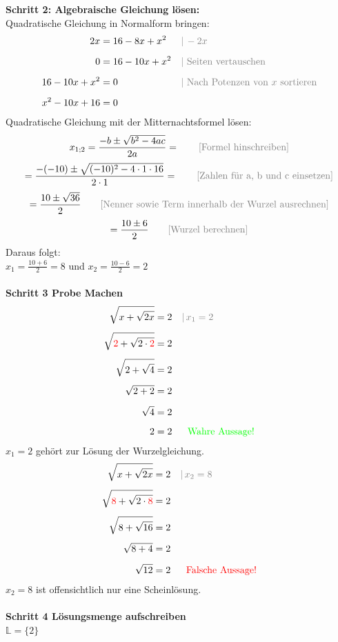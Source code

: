 \documentclass[a4paper,10pt]{article}
\begin{document}
\begin{multicols}{3}
    \textbf{ Schritt 2: Algebraische Gleichung lösen:}\\
    Quadratische Gleichung in Normalform bringen:
    \begin{align*} 2x &= 16 - 8x + x^2 &&{\color{gray}|\, -2x} \\[5px] 0 &= 16 - 10x + x^2 &&{\color{gray}| \text{ Seiten vertauschen}} \\[5px] 16 - 10x + x^2 &= 0 &&{\color{gray}| \text{ Nach Potenzen von $x$ sortieren}} \\[5px] x^2 - 10x + 16 &= 0 \end{align*}
    Quadratische Gleichung mit der Mitternachtsformel lösen:
    \[x_{1;2}=\frac{-b\pm\sqrt{b^2-4ac}}{2a}=\qquad\color{gray}{\text{[Formel hinschreiben]}}\]
    \[=\frac{-(-10)\pm\sqrt{(-10)^2-4\cdot 1\cdot 16}}{2\cdot 1}=\qquad\color{gray}{\text{[Zahlen für a, b und c einsetzen]}}\]
    \[=\frac{10\pm\sqrt{36}}{2}\qquad\color{gray}{\text{[Nenner sowie Term innerhalb der Wurzel ausrechnen]}}\]
    \[=\frac{10\pm 6}{2}\qquad\color{gray}{\text{[Wurzel berechnen]}}\]
    Daraus folgt: \\
    $x_1=\frac{10+6}{2}=8$ und $x_2=\frac{10-6}{2}=2$\\~\\
    \textbf{Schritt 3 Probe Machen}
    \begin{align*} \sqrt{x + \sqrt{2x}} &= 2 &&{\color{gray}|\, x_1 = 2} \\[5px] \sqrt{{\color{red}2} + \sqrt{2 \cdot {\color{red}2}}} &= 2 \\[5px] \sqrt{2 + \sqrt{4}} &= 2 \\[5px] \sqrt{2 + 2} &= 2 \\[5px] \sqrt{4} &= 2 \\[5px] 2 &= 2 &&{\color{green}\phantom{|} \text{ Wahre Aussage!}} \end{align*}
    $x_1 = 2$ gehört zur Lösung der Wurzelgleichung.
    \begin{align*} \sqrt{x + \sqrt{2x}} &= 2 &&{\color{gray}|\, x_2 = 8} \\[5px] \sqrt{{\color{red}8} + \sqrt{2 \cdot {\color{red}8}}} &= 2 \\[5px] \sqrt{8 + \sqrt{16}} &= 2 \\[5px] \sqrt{8 + 4} &= 2 \\[5px] \sqrt{12} &= 2 &&{\color{red}\phantom{|} \text{ Falsche Aussage!}} \end{align*}
    $x_2 = 8$ ist offensichtlich nur eine Scheinlösung. \\~\\
    \textbf{Schritt 4 Lösungsmenge aufschreiben}\\
    $\mathbb{L} = \{2\}$

\end{multicols}
\end{document}
